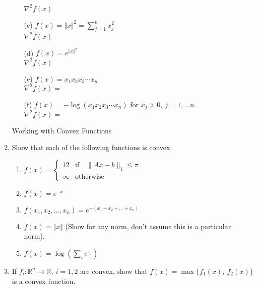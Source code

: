 \documentclass[12pt]{amsart}
\newcommand{\norm}[1]{\Vert #1 \Vert}
\newcommand{\Rn}{\R^n}
\newcommand{\R}{{\mathbb{R}}}
\newcommand{\grad}{\nabla}
\newcommand{\map}[3]{#1:#2\rightarrow #3}
\begin{document}
\begin{enumerate}
\begin{enumerate}
$\grad^2 f(x)$ \\

\item[(c)] $f(x)=\norm{x}^2=\sum_{j=1}^nx_j^2$\\

$\grad^2 f(x) $\\

\item[(d)] $f(x)=\displaystyle e^{\norm{x}^2}$\\

$\grad^2 f(x)$\\


\item[(e)] $f(x)=x_1x_2x_3\cdots x_n $ \\

$\grad^2 f(x) = $\\

\item[(f)] $f(x)=-\log(x_1x_2x_3\cdots x_n)$ for $x_j>0,\ j=1,\dots n$.\\

$\grad^2 f(x) =$
\end{enumerate}



\newpage

\noindent
{\sf Working with Convex Functions}

\item
Show that each of the following functions is convex.
\begin{enumerate}
\item $f(x) = \begin{cases} 12 &\text{if}  \quad \|Ax - b\|_1 \leq \pi \\ \infty & \text{otherwise}\end{cases}$

\item
$f(x)=e^{-x}$
\item
$f(x_1,x_2,\dots,x_n)=e^{-(x_1+x_2+\dots +x_n)}$
\item
$f(x)=\norm{x}$ (Show for any norm, don't assume this is a particular norm). 
\item 
$f(x) = \log \left( \sum_i e^{x_i}\right)$
\end{enumerate}

\item
If $\map{f_i}{\Rn}{\R},\ i=1,2$ are convex, show that $f(x)=\max\{f_1(x),\ f_2(x)\}$
is a convex function. \\


\end{enumerate}
\end{document}

